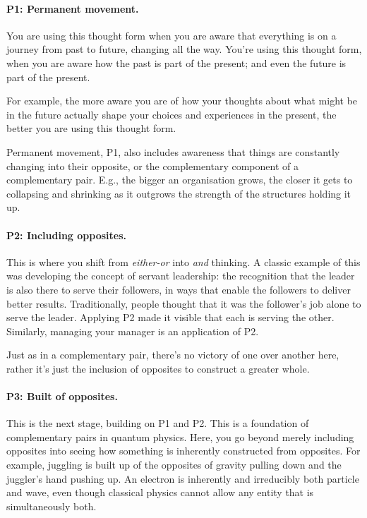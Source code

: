 \paragraph{\textbf{P1: Permanent movement.}}
You are using this thought form when you are aware that everything is on a journey from past to future, changing all the way. You're using this thought form, when you are aware how the past is part of the present; and even the future is part of the present. 


For example, the more aware you are of how your thoughts about what might be in the future actually shape your choices and experiences in the present, the better you are using this thought form. 


Permanent movement, P1, also includes awareness that things are constantly changing into their opposite, or the complementary component of a complementary pair.  E.g., the bigger an organisation grows, the closer it gets to collapsing and shrinking as it outgrows the strength of the structures holding it up.
\paragraph{\textbf{P2: Including opposites.}}
This is where you shift  from \emph{either-or} into \emph{and} thinking. A classic example of this was developing the concept of servant leadership: the recognition that the leader is also there to serve their followers, in ways that enable the followers to deliver better results. Traditionally, people thought that it was the follower’s job alone to serve the leader. Applying P2 made it visible that each is serving the other. Similarly, managing your manager is an application of P2. 


Just as in a complementary pair, there's no victory of one over another here, rather it's just the inclusion of opposites to construct a greater whole.
\paragraph{\textbf{P3: Built of opposites.}}
This is the next stage, building on P1 and P2. This is a foundation of complementary pairs in quantum physics. Here, you go beyond merely including opposites into seeing how something is inherently constructed from opposites. For example, juggling is built up of the opposites of gravity pulling down and the juggler's hand pushing up. An electron is inherently and irreducibly both particle and wave, even though classical physics  cannot allow any entity that is simultaneously both. 


